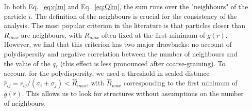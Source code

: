 \documentclass[11pt,a4paper]{article}
\begin{document}
In both Eq.~\ref{eq:qlm} and Eq.~\ref{eq:Qlm}, the sum runs over the "neighbours" of the particle $i$. The definition of the neighbours is crucial for the consistency of the analysis. The most popular criterion in the literature is that particles closer than $R_{max}$ are neighbours, with $R_{max}$ often fixed at the first minimum of $g(r)$. However, we find that this criterion has two major drawbacks: no account of polydispersity and negative correlation between the number of neighbours and the value of the $q_\ell$ (this effect is less pronounced after coarse-graining). To account for the polydispersity, we used a threshold in scaled distance $\hat{r}_{i j} = r_{i j} /(\sigma_i+\sigma_j) < \hat{R}_{max}$, with $\hat{R}_{max}$ corresponding to the first minimum of $g(\hat{r})$. This allows us to look for structures without assumptions on the number of neighbours.
\end{document}
